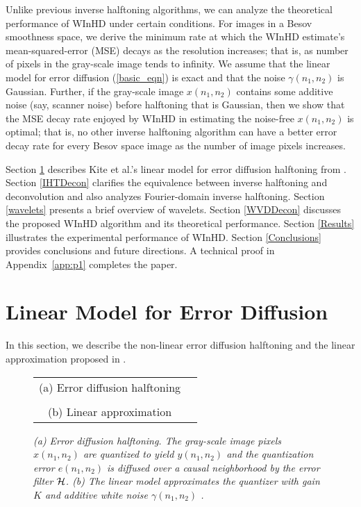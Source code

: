 \documentclass[11pt]{article}
\def\nnnx {n_1}
\def\nnny {n_2}
\def\cH { {\cal{H}} }
\begin{document}
Unlike previous inverse halftoning algorithms, we can analyze the
theoretical performance of \mbox{WInHD} under certain conditions. For
images in a Besov smoothness space, we derive the minimum rate at
which the \mbox{WInHD} estimate's mean-squared-error (MSE) decays as
the resolution increases; that is, as number of pixels in the
gray-scale image tends to infinity. We assume that the linear model
for error diffusion (\ref{basic_eqn}) is exact and that the noise
$\gamma(\nnnx,\nnny)$ is Gaussian. Further, if the gray-scale image
$x(\nnnx,\nnny)$ contains some additive noise (say, scanner noise)
before halftoning that is Gaussian, then we show that the MSE decay
rate enjoyed by \mbox{WInHD} in estimating the noise-free
$x(\nnnx,\nnny)$ is optimal; that is, no other inverse halftoning
algorithm can have a better error decay rate for every Besov space
image as the number of image pixels increases.


Section \ref{LinearModel} describes Kite et al.'s linear model for
error diffusion halftoning from \cite{Kite,KiteJournal}.  Section
\ref{IHTDecon} clarifies the equivalence between inverse halftoning
and deconvolution and also analyzes Fourier-domain inverse
halftoning. Section \ref{wavelets} presents a brief overview of
wavelets. Section \ref{WVDDecon} discusses the proposed \mbox{WInHD}
algorithm and its theoretical performance. Section \ref{Results}
illustrates the experimental performance of \mbox{WInHD}. Section
\ref{Conclusions} provides conclusions and future
directions. A technical proof in Appendix~\ref{app:p1} completes the
paper.




\section{Linear Model for Error Diffusion}		
\label{LinearModel}

In this section, we describe the non-linear error diffusion halftoning
and the linear approximation proposed in \cite{Kite,KiteJournal}.

\begin{figure}[bt]
\begin{center}
\begin{tabular}{cc}
 \\
(a) Error diffusion halftoning\\[4mm]
 \\
 (b) Linear approximation 
\end{tabular}
\end{center}
\vspace{-2mm}
\caption[Original model]{\small \sl {(a) Error diffusion
halftoning. The gray-scale image pixels $x(\nnnx,\nnny)$ are quantized to
yield $y(\nnnx,\nnny)$ and the quantization error $e(\nnnx,\nnny)$ is diffused
over a causal neighborhood by the error filter $\cH$. (b) The linear
model approximates the quantizer with gain $K$ and additive white
noise $\gamma(\nnnx,\nnny)$ \cite{Kite}.}}
\label{block_fig}
\vspace{-2mm}
\end{figure}
\end{document}
